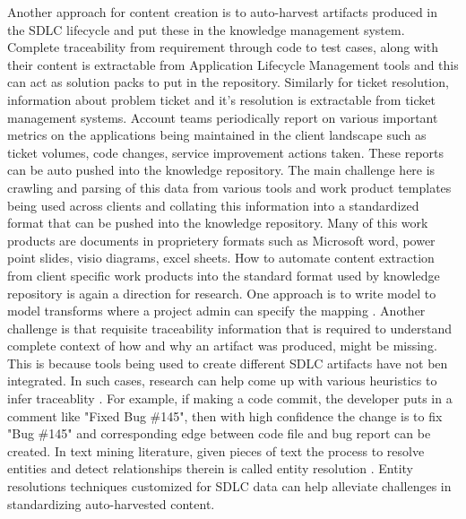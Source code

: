 Another approach for content creation is to auto-harvest artifacts produced in the SDLC lifecycle and put these in the knowledge management system. Complete traceability from requirement through code to test cases, along with their content is extractable from Application Lifecycle Management tools and this can act as solution packs to put in the repository. Similarly for ticket resolution, information about problem ticket and it's resolution is extractable from ticket management systems. Account teams periodically report on various important metrics on the applications being maintained in the client landscape such as ticket volumes, code changes, service improvement actions taken. These reports can be auto pushed into the knowledge repository. The main challenge here is crawling and parsing of this data from various tools and work product templates being used across clients and collating this information into a standardized format that can be pushed into the knowledge repository. Many of this work products are documents in proprietery formats such as Microsoft word, power point slides, visio diagrams, excel sheets. How to automate content extraction from client specific work products into the standard format used by knowledge repository is again a direction for research. One approach is to write model to model transforms where a project admin can specify the mapping \cite{}. Another challenge is that requisite traceability information that is required to understand complete context of how and why an artifact was produced, might be missing. This is because tools being used to create different SDLC artifacts have not ben integrated. In such cases, research can help come up with various heuristics to infer traceablity \cite{}. For example, if making a code commit, the developer puts in a comment like "Fixed Bug \#145", then with high confidence the change is to fix "Bug \#145" and corresponding edge between code file and bug report can be created. In text mining literature, given pieces of text the process to resolve entities and detect relationships therein is called entity resolution \cite{}. Entity resolutions techniques customized for SDLC data can help alleviate challenges in standardizing auto-harvested content.

